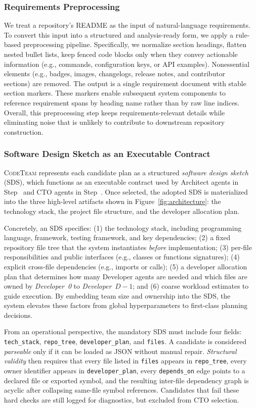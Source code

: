 \documentclass[format=acmsmall, review=false, screen=true]{acmart}
\newcommand{\tool}{\textsc{CodeTeam}\xspace}
\begin{document}
\subsubsection{Requirements Preprocessing}
We treat a repository's README as the input of natural-language requirements. To convert this input into a structured and analysis-ready form, we apply a rule-based preprocessing pipeline. Specifically, we normalize section headings, flatten nested bullet lists, keep fenced code blocks only when they convey actionable information (e.g., commands, configuration keys, or API examples). Nonessential elements (e.g., badges, images, changelogs, release notes, and contributor sections) are removed. The output is a single requirement document with stable section markers. These markers enable subsequent system components to reference requirement spans by heading name rather than by raw line indices. Overall, this preprocessing step keeps requirements-relevant details while eliminating noise that is unlikely to contribute to downstream repository construction.

\subsubsection{Software Design Sketch as an Executable Contract}
\tool represents each candidate plan as a structured \emph{software design sketch} (SDS), which functions as an executable contract used by Architect agents in Step~ and CTO agents in Step~. Once selected, the adopted SDS is materialized into the three high-level artifacts shown in Figure~\ref{fig:architecture}: the technology stack, the project file structure, and the developer allocation plan. 

Concretely, an SDS specifies: (1) the technology stack, including programming language, framework, testing framework, and key dependencies; (2) a fixed repository file tree that the system instantiates \emph{before} implementation; (3) per-file responsibilities and public interfaces (e.g., classes or functions signatures); (4) explicit cross-file dependencies (e.g., imports or calls); (5) a developer allocation plan that determines how many Developer agents are needed and which files are owned by \textit{Developer~0} to \textit{Developer~$D{-}1$}; and (6) coarse workload estimates to guide execution. By embedding team size and ownership into the SDS, the system elevates these factors from global hyperparameters to first-class planning decisions.

From an operational perspective, the mandatory SDS must include four fields: \texttt{tech\_stack}, \texttt{repo\_tree}, \texttt{developer\_plan}, and \texttt{files}. A candidate is considered \emph{parseable} only if it can be loaded as JSON without manual repair. \emph{Structural validity} then requires that every file listed in \texttt{files} appears in \texttt{repo\_tree}, every owner identifier appears in \texttt{developer\_plan}, every \texttt{depends\_on} edge points to a declared file or exported symbol, and the resulting inter-file dependency graph is acyclic after collapsing same-file symbol references. Candidates that fail these hard checks are still logged for diagnostics, but excluded from CTO selection.
\end{document}
